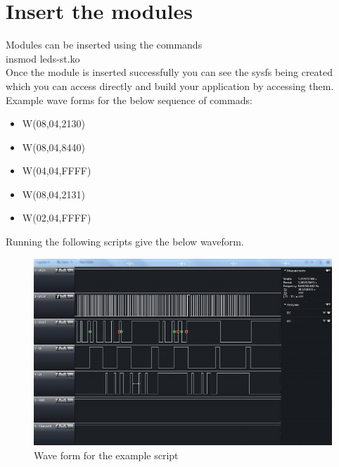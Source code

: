 \section{Insert the modules}
Modules can be inserted using the commands \\
insmod leds-st.ko\\
Once the module is inserted successfully you can see the sysfs being created which you can access
directly and build your application by accessing them.\\
Example wave forms for the below sequence of commads:\\
\begin{itemize}
	\item W(08,04,2130)
	\item W(08,04,8440)
	\item W(04,04,FFFF)
	\item W(08,04,2131)
	\item W(02,04,FFFF)
\end{itemize}
Running the following scripts give the below waveform.
\begin{figure}[ht]
         \centering
         \includegraphics[scale=0.5]{images/waveform.png}
         \caption{Wave form for the example script}
\end{figure}









